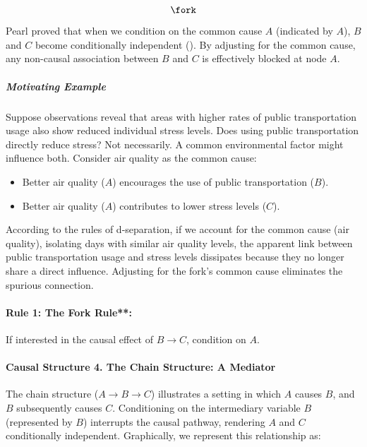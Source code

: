 \documentclass[
  singlecolumn]{article}
\let\oldparagraph\paragraph
\renewcommand{\paragraph}[1]{\oldparagraph{#1}\mbox{}}
\let\oldsubparagraph\subparagraph
\renewcommand{\subparagraph}[1]{\oldsubparagraph{#1}\mbox{}}
\providecommand{\tightlist}{%
  \setlength{\itemsep}{0pt}\setlength{\parskip}{0pt}}\usepackage{longtable,booktabs,array}
\begin{document}
\[\fork\]

Pearl proved that when we condition on the common cause \(A\) (indicated
by \(\boxed{A}\)), \(B\) and \(C\) become conditionally independent
(). By adjusting for the common
cause, any non-causal association between \(B\) and \(C\) is effectively
blocked at node \(A\).

\subparagraph{Motivating Example}\label{motivating-example}

Suppose observations reveal that areas with higher rates of public
transportation usage also show reduced individual stress levels. Does
using public transportation directly reduce stress? Not necessarily. A
common environmental factor might influence both. Consider air quality
as the common cause:

\begin{itemize}
\tightlist
\item
  Better air quality (\(A\)) encourages the use of public transportation
  (\(B\)).
\item
  Better air quality (\(A\)) contributes to lower stress levels (\(C\)).
\end{itemize}

According to the rules of d-separation, if we account for the common
cause (air quality), isolating days with similar air quality levels, the
apparent link between public transportation usage and stress levels
dissipates because they no longer share a direct influence. Adjusting
for the fork's common cause eliminates the spurious connection.

\paragraph{Rule 1: The Fork Rule**:}\label{rule-1-the-fork-rule}

If interested in the causal effect of \(B \to C\), condition on
\(\boxed{A}\).

\paragraph{Causal Structure 4. The Chain Structure: A
Mediator}\label{causal-structure-4.-the-chain-structure-a-mediator}

The chain structure (\(A \rightarrow B \rightarrow C\)) illustrates a
setting in which \(A\) causes \(B\), and \(B\) subsequently causes
\(C\). Conditioning on the intermediary variable \(B\) (represented by
\(\boxed{B}\)) interrupts the causal pathway, rendering \(A\) and \(C\)
conditionally independent. Graphically, we represent this relationship
as:
\end{document}
